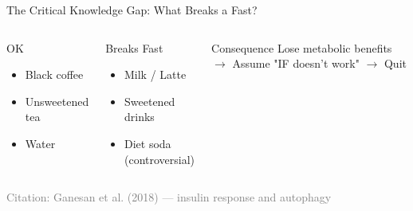 \documentclass[aspectratio=169, 12pt]{beamer}
\begin{document}
\begin{frame}{The Critical Knowledge Gap: What Breaks a Fast?}
  \begin{center}
  \end{center}
  
  \vspace{0.3cm}
  \begin{columns}[T]
    \begin{block}{OK}
      \begin{itemize}
        \item Black coffee
        \item Unsweetened tea
        \item Water
      \end{itemize}
    \end{block}
    
    \begin{block}{Breaks Fast}
      \begin{itemize}
        \item Milk / Latte
        \item Sweetened drinks
        \item Diet soda (controversial)
      \end{itemize}
    \end{block}
    
    \begin{block}{Consequence}
      Lose metabolic benefits $\rightarrow$ Assume "IF doesn't work" $\rightarrow$ Quit
    \end{block}
  \end{columns}
  
  \tiny \textcolor{gray}{Citation: Ganesan et al. (2018) — insulin response and autophagy}
\end{frame}
\end{document}
